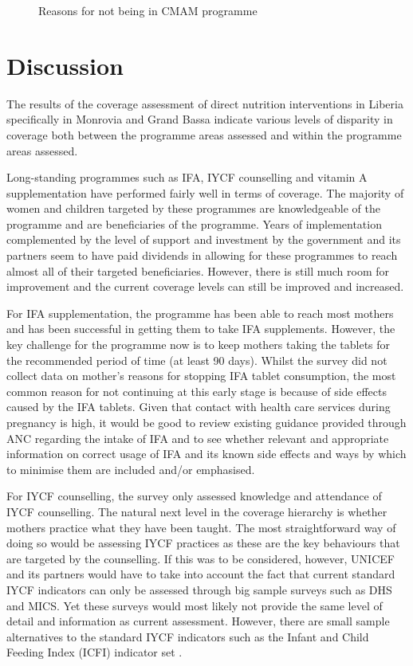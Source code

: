 \documentclass[12pt,a4paper]{article}
\begin{document}
\begin{figure}[H]
{}

\caption{Reasons for not being in CMAM programme}\label{fig:cmam3}
\end{figure}

\hypertarget{discussion}{%
\section{Discussion}\label{discussion}}

The results of the coverage assessment of direct nutrition interventions in Liberia specifically in Monrovia and Grand Bassa indicate various levels of disparity in coverage both between the programme areas assessed and within the programme areas assessed.

Long-standing programmes such as IFA, IYCF counselling and vitamin A supplementation have performed fairly well in terms of coverage. The majority of women and children targeted by these programmes are knowledgeable of the programme and are beneficiaries of the programme. Years of implementation complemented by the level of support and investment by the government and its partners seem to have paid dividends in allowing for these programmes to reach almost all of their targeted beneficiaries. However, there is still much room for improvement and the current coverage levels can still be improved and increased.

For IFA supplementation, the programme has been able to reach most mothers and has been successful in getting them to take IFA supplements. However, the key challenge for the programme now is to keep mothers taking the tablets for the recommended period of time (at least 90 days). Whilst the survey did not collect data on mother's reasons for stopping IFA tablet consumption, the most common reason for not continuing at this early stage is because of side effects caused by the IFA tablets. Given that contact with health care services during pregnancy is high, it would be good to review existing guidance provided through ANC regarding the intake of IFA and to see whether relevant and appropriate information on correct usage of IFA and its known side effects and ways by which to minimise them are included and/or emphasised.

For IYCF counselling, the survey only assessed knowledge and attendance of IYCF counselling. The natural next level in the coverage hierarchy is whether mothers practice what they have been taught. The most straightforward way of doing so would be assessing IYCF practices as these are the key behaviours that are targeted by the counselling. If this was to be considered, however, UNICEF and its partners would have to take into account the fact that current standard IYCF indicators can only be assessed through big sample surveys such as DHS and MICS. Yet these surveys would most likely not provide the same level of detail and information as current assessment. However, there are small sample alternatives to the standard IYCF indicators such as the Infant and Child Feeding Index (ICFI) indicator set \citep{Guevarra:2016uw}.
\end{document}
